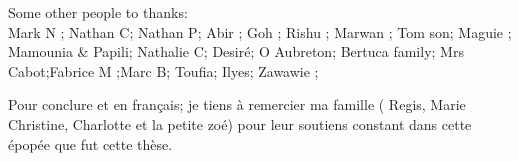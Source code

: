 \documentclass[english]{spimubphdthesis}
\begin{document}
Some other people to thanks:\\ 
  Mark N ; Nathan C; Nathan P; Abir ; Goh ; Rishu ; Marwan ; Tom son; Maguie ; Mamounia \& Papili; Nathalie C; Desiré; O Aubreton; Bertuca family; Mrs Cabot;Fabrice M ;Marc B; Toufia; Ilyes; Zawawie ; 



Pour conclure et en français;  je tiens à remercier  ma famille ( Regis, Marie Christine, Charlotte et la petite zoé) pour leur soutiens constant dans cette épopée que fut cette  thèse.  
\tableofcontents

\mainmatter
\end{document}
